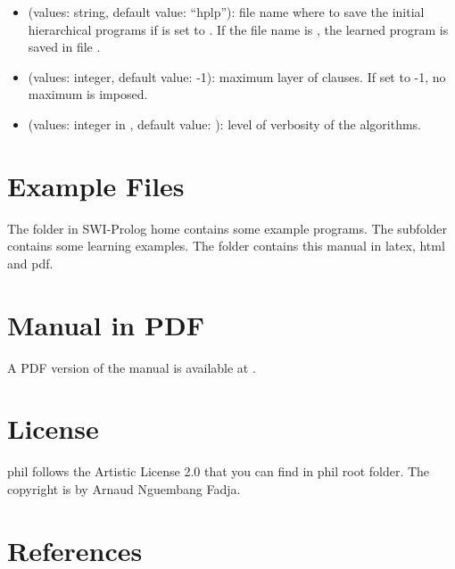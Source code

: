 \documentclass[letterpaper,10pt,english]{sphinxmanual}
\begin{document}
\begin{itemize}
\begin{itemize}
\item {} 
 (values: string, default value: “hplp”): file name where to save the initial hierarchical programs if   is set to . If the file name is , the learned program is saved in file .

\item {} 
 (values: integer, default value: -1): maximum layer of clauses. If set to -1, no maximum is imposed.

\item {} 
 (values: integer in \sphinxcode{\sphinxupquote{{[}1,3{]}}}, default value: ): level of verbosity of the algorithms.

\end{itemize}

\end{itemize}


\chapter{Example Files}
\label{\detokenize{index:example-files}}
The  folder in SWI-Prolog home contains some example programs.
The subfolder  contains some learning examples.
The  folder contains this manual in latex, html and pdf.


\chapter{Manual in PDF}
\label{\detokenize{index:manual-in-pdf}}
A PDF version of the manual is available at .


\chapter{License}
\label{\detokenize{index:license}}
phil follows the Artistic License 2.0 that you can find in phil root folder.
The copyright is by Arnaud Nguembang Fadja.


\chapter{References}
\label{\detokenize{index:references}}
\end{document}
